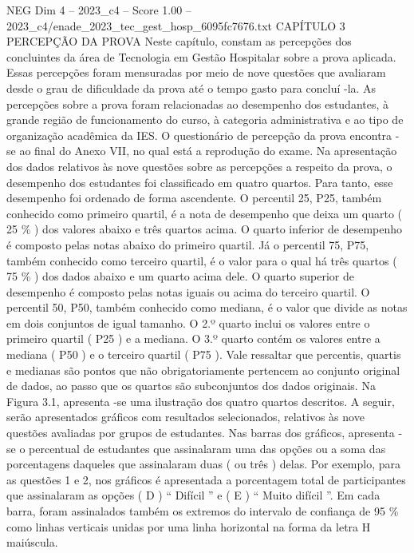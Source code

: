 \begin{textsample}{NEG Dim 4 – 2023\_c4 – Score 1.00 – 2023\_c4/enade\_2023\_tec\_gest\_hosp\_6095fc7676.txt}  \label{ex:f4_neg_196}
CAPÍTULO 3 PERCEPÇÃO DA PROVA Neste capítulo, constam as percepções dos concluintes da área de Tecnologia em Gestão Hospitalar sobre a prova aplicada.
Essas percepções foram mensuradas por meio de nove questões que avaliaram desde o grau de dificuldade da prova até o tempo gasto para concluí -la.
As percepções sobre a prova foram relacionadas ao desempenho dos estudantes, à grande região de funcionamento do curso, à categoria administrativa e ao tipo de organização acadêmica da IES.
O questionário de percepção da prova encontra -se ao final do Anexo VII, no qual está a reprodução do exame.
Na apresentação dos dados relativos às nove questões sobre as percepções a respeito da prova, o desempenho dos estudantes foi classificado em quatro quartos.
Para tanto, esse desempenho foi ordenado de forma ascendente.
O percentil 25, P25, também conhecido como primeiro quartil, é a nota de desempenho que deixa um quarto ( 25 \% ) dos valores abaixo e três quartos acima.
O quarto inferior de desempenho é composto pelas notas abaixo do primeiro quartil.
Já o percentil 75, P75, também conhecido como terceiro quartil, é o valor para o qual há três quartos ( 75 \% ) dos dados abaixo e um quarto acima dele.
O quarto superior de desempenho é composto pelas notas iguais ou acima do terceiro quartil.
O percentil 50, P50, também conhecido como mediana, é o valor que divide as notas em dois conjuntos de igual tamanho.
O 2.º quarto inclui os valores entre o primeiro quartil ( P25 ) e a mediana.
O 3.º quarto contém os valores entre a mediana ( P50 ) e o terceiro quartil ( P75 ).
Vale ressaltar que percentis, quartis e medianas são pontos que não obrigatoriamente pertencem ao conjunto original de dados, ao passo que os quartos são subconjuntos dos dados originais.
Na Figura 3.1, apresenta -se uma ilustração dos quatro quartos descritos.
A seguir, serão apresentados gráficos com resultados selecionados, relativos às nove questões avaliadas por grupos de estudantes.
Nas barras dos gráficos, apresenta -se o percentual de estudantes que assinalaram uma das opções ou a soma das porcentagens daqueles que assinalaram duas ( ou três ) delas.
Por exemplo, para as questões 1 e 2, nos gráficos é apresentada a porcentagem total de participantes que assinalaram as opções ( D ) “ Difícil ” e ( E ) “ Muito difícil ”.
Em cada barra, foram assinalados também os extremos do intervalo de confiança de 95 \% como linhas verticais unidas por uma linha horizontal na forma da letra H maiúscula.

\end{textsample}
